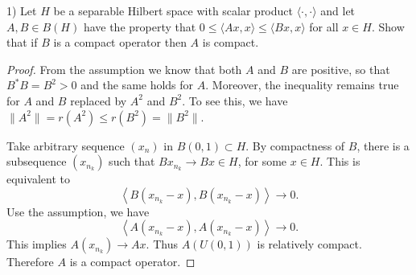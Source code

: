 
\begin{problem}
	1) Let $H$ be a separable Hilbert space with scalar product $\langle\cdot, \cdot\rangle$ and let $A, B \in B(H)$ have the property that $0 \leq\langle A x, x\rangle \leq\langle B x, x\rangle$ for all $x \in H$. Show that if $B$ is a compact operator then $A$ is compact.
\end{problem}
\begin{proof}
	From the assumption we know that both $A$ and $B$ are positive, so that $B^* B = B^2 > 0$ and the same holds for $A$. Moreover, the inequality remains true for $A$ and $B$ replaced by $A^2$ and $B^2$. To see this, we have $\|A^2\| = r(A^2) \le r(B^2) = \|B^2\|$. 
	
	Take arbitrary sequence $(x_n)$ in $B(0,1) \subset H$. By compactness of $B$, there is a subsequence $(x_{n_k})$ such that $B x_{n_k} \to B x \in H$, for some  $x \in H$. This is equivalent to
	\[
		\left\langle B\left( x_{n_k} - x \right) , B\left( x_{n_k} - x \right)  \right\rangle  \to 0
	.\] 
	Use the assumption, we have
\[
		\left\langle A\left( x_{n_k} - x \right) , A\left( x_{n_k} - x \right)  \right\rangle  \to 0
	.\]
	This implies $A\left( x_{n_k} \right) \to A x$. Thus $A\left( U(0,1) \right) $ is relatively compact. Therefore $A$ is a compact operator.
\end{proof}


